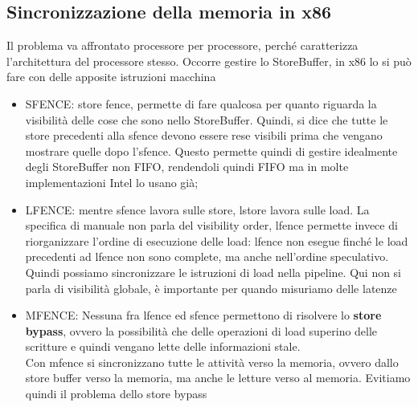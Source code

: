 \documentclass[12pt, oneside]{extbook}
\begin{document}
\subsection{Sincronizzazione della memoria in x86}
Il problema va affrontato processore per processore, perché caratterizza l'architettura del processore stesso. Occorre gestire lo StoreBuffer, in x86 lo si può fare con delle apposite istruzioni macchina
\begin{itemize}
\item SFENCE: store fence, permette di fare qualcosa per quanto riguarda la visibilità delle cose che sono nello StoreBuffer. Quindi, si dice che tutte le store precedenti alla sfence devono essere rese visibili prima che vengano mostrare quelle dopo l'sfence. Questo permette quindi di gestire idealmente degli StoreBuffer non FIFO, rendendoli quindi FIFO ma in molte implementazioni Intel lo usano già;
\item LFENCE: mentre sfence lavora sulle store, lstore lavora sulle load. La specifica di manuale non parla del visibility order, lfence permette invece di riorganizzare l'ordine di esecuzione delle load: lfence non esegue finché le load precedenti ad lfence non sono complete, ma anche nell'ordine speculativo. Quindi possiamo sincronizzare le istruzioni di load nella pipeline. Qui non si parla di visibilità globale, è importante per quando misuriamo delle latenze
\item MFENCE: Nessuna fra lfence ed sfence permettono di risolvere lo \textbf{store bypass}, ovvero la possibilità che delle operazioni di load superino delle scritture e quindi vengano lette delle informazioni stale. \\ Con mfence si sincronizzano tutte le attività verso la memoria, ovvero dallo store buffer verso la memoria, ma anche le letture verso al memoria. Evitiamo quindi il problema dello store bypass
\end{itemize}
\end{document}
